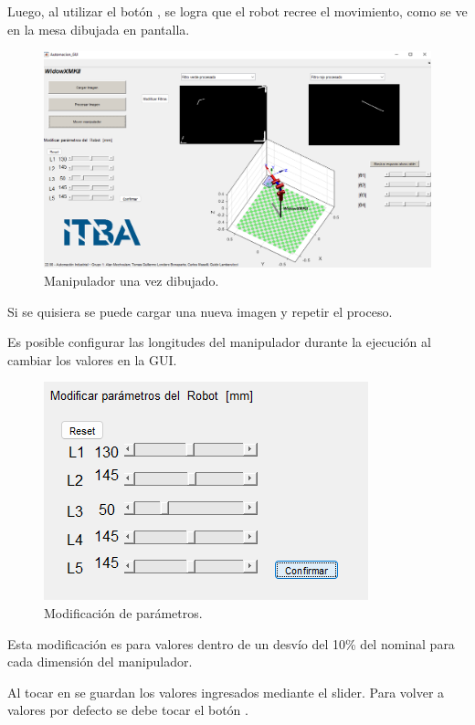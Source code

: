 Luego, al utilizar el botón , se logra que el robot recree el movimiento, como se ve en la mesa dibujada en pantalla.
\begin{figure}[H]
	\centering
	\includegraphics[width=\linewidth]{linea}
	\caption{Manipulador una vez dibujado.}	
	\label{fig:linea}
\end{figure}

Si se quisiera se puede cargar una nueva imagen y repetir el proceso.


Es posible configurar las longitudes del manipulador durante la ejecución al cambiar los valores en la GUI.
\begin{figure}[H]
	\centering
	\includegraphics[width=0.35\linewidth]{mm}
	\caption{Modificación de parámetros.}	
	\label{fig:mm}
\end{figure}

Esta modificación es para valores dentro de un desvío del 10\% del nominal para cada dimensión del manipulador.

Al tocar en  se guardan los valores ingresados mediante el slider.
Para volver a valores por defecto se debe tocar el botón .


